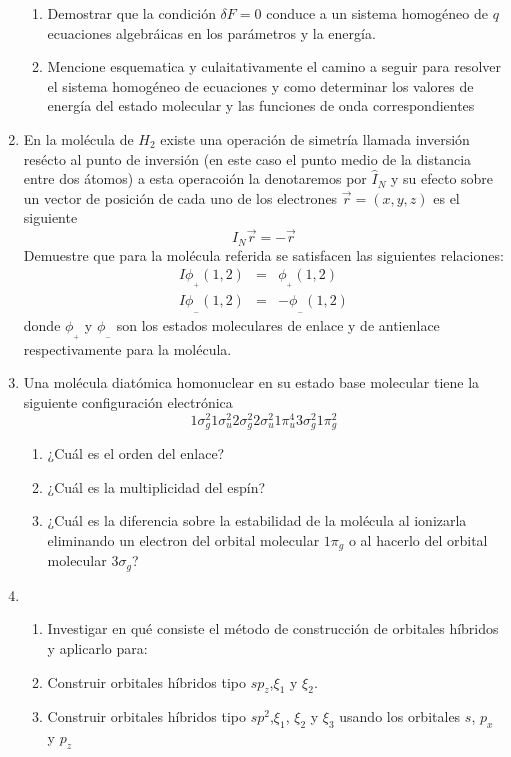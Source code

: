 \documentclass[]{article}
\begin{document}
\begin{enumerate}
\begin{enumerate}
\item Demostrar que la condición $\delta F=0$ conduce a un sistema homogéneo de $q$ ecuaciones algebráicas en los parámetros y la energía.
\item Mencione esquematica y culaitativamente el camino a seguir para resolver  el sistema homogéneo de ecuaciones  y como determinar los valores de energía del estado molecular  y las funciones de onda correspondientes
\end{enumerate}
\item En la molécula de $H_2$ existe una operación de simetría llamada inversión resécto al punto de inversión (en este caso el punto medio de la distancia entre dos átomos) a esta operacoión la denotaremos por $\hat{I}_N$ y su efecto sobre un vector de posición de cada uno de los electrones $\vec{r}=(x,y,z)$ es el siguiente
$$
\hat{I}_N\vec{r}=-\vec{r}
$$
Demuestre que para la molécula referida se satisfacen las siguientes relaciones:
\begin{eqnarray*}
I\phi_{_{+}}(1,2)&=&\phi_{_{+}}(1,2)\\
I\phi_{_{-}}(1,2)&=&-\phi_{_{-}}(1,2)
\end{eqnarray*}
donde $\phi_{_{+}}$ y $\phi_{_{-}}$ son los estados moleculares de enlace y de antienlace respectivamente para la molécula.
\item Una molécula diatómica homonuclear en su estado base molecular tiene la siguiente configuración electrónica
$$
1\sigma^2_g1\sigma^2_u2\sigma^2_g2\sigma^2_u1\pi^4_u3\sigma^2_g1\pi^2_g
$$
\begin{enumerate}
\item ¿Cuál es el orden del enlace?
\item ¿Cuál es la multiplicidad del espín?
\item ¿Cuál es la diferencia sobre la estabilidad de la molécula al ionizarla eliminando un electron del orbital molecular $1\pi_g$ o al hacerlo del orbital molecular $3\sigma_g$?
\end{enumerate}
\item
  \begin{enumerate}
  \item Investigar en qué consiste el método de construcción de orbitales híbridos y aplicarlo para:
  \item Construir orbitales híbridos tipo $sp_z$,$\xi_1$ y $\xi_2$.
  \item Construir orbitales híbridos tipo $sp^2$,$\xi_1$, $\xi_2$ y $\xi_3$ usando los orbitales $s$, $p_x$ y $p_z$
  \end{enumerate}

\end{enumerate}
\end{document}
